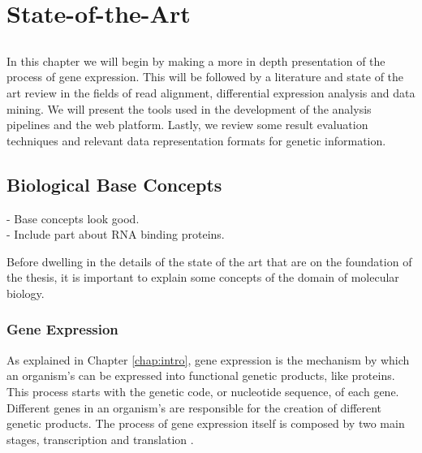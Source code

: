 \chapter{State-of-the-Art} \label{chap:sota}

\section*{}


In this chapter we will begin by making a more in depth presentation of the
process of gene expression. This will be followed by a literature and state of
the art review in the fields of read alignment, differential expression analysis
and data mining. We will present the tools used in the development of the
analysis pipelines and the web platform. Lastly, we review some result
evaluation techniques and relevant data representation formats for genetic
information.

\section{Biological Base Concepts}

\begin{Notes}
- Base concepts look good.\\
- Include part about RNA binding proteins.\\
\end{Notes}

Before dwelling in the details of the state of the art that are on the
foundation of the thesis, it is important to explain some concepts of the
domain of molecular biology.

\subsection{Gene Expression}

As explained in Chapter \ref{chap:intro}, gene expression is the mechanism by
which an organism's \dna{} can be expressed into functional genetic products,
like proteins. This process starts with the genetic code, or nucleotide
sequence, of each gene. Different genes in an organism's \dna{} are responsible
for the creation of different genetic products. The process of gene expression
itself is composed by two main stages, transcription and translation
\cite{leic:gene_expr}.

